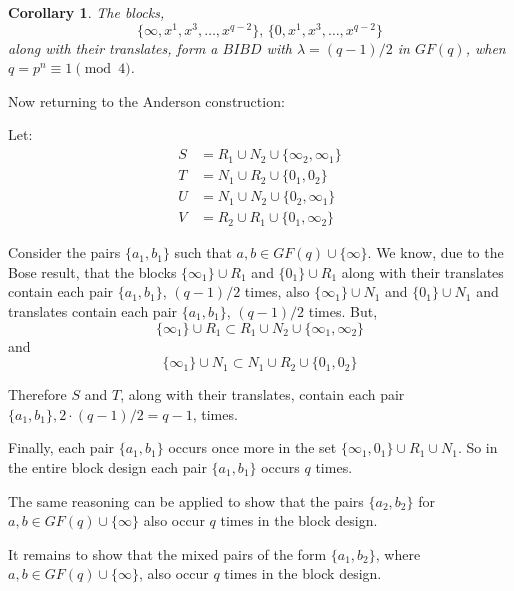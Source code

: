 \documentclass[
  11pt,
  a4paper]{book}
\newtheorem{corollary}{Corollary}[theorem]
\begin{document}
\begin{corollary}
The blocks,
\begin{equation}
\{\infty, x^1, x^3, \ldots, x^{q - 2}\},\, \{0, x^1, x^3, \ldots, x^{q - 2}\}
\end{equation}
along with their translates, form a $BIBD$ with
$\lambda = (q - 1)/2$ in $GF(q)$, when
$q = p^n \equiv 1\pmod 4$.
\end{corollary}

Now returning to the Anderson construction:

Let: \begin{align}
  S &= R_1 \cup N_2 \cup \{\infty _2, \infty _1\} \\
  T &= N_1 \cup R_2 \cup \{0_1, 0_2\} \\
  U &= N_1 \cup N_2 \cup \{0 _2, \infty _1\} \\
  V &= R_2 \cup R_1 \cup \{0_1, \infty _2\}
\end{align}

Consider the pairs \(\{a_1, b_1\}\) such that
\(a, b \in GF(q) \cup \{\infty\}\). We know, due to the Bose result,
that the blocks \(\{\infty _1\} \cup R_1\) and \(\{0 _1\} \cup R_1\)
along with their translates contain each pair \(\{a_1, b_1\}\),
\((q - 1)/2\) times, also \(\{\infty _1\} \cup N_1\) and
\(\{0 _1\} \cup N_1\) and translates contain each pair \(\{a_1, b_1\}\),
\((q - 1)/2\) times. But, \begin{equation}
\{\infty _1\} \cup R_1 \subset R_1 \cup N_2 \cup \{\infty _1, \infty _2\}
\end{equation} and \begin{equation}
\{\infty _1\} \cup N_1 \subset N_1 \cup R_2 \cup \{0_1, 0_2\}
\end{equation}

Therefore \(S\) and \(T\), along with their translates, contain each
pair \(\{a_1, b_1\}, 2\cdot (q - 1)/2 = q - 1\), times.

Finally, each pair \(\{a_1, b_1\}\) occurs once more in the set
\(\{\infty _1, 0_1\} \cup R_1 \cup N_1\). So in the entire block design
each pair \(\{a_1, b_1\}\) occurs \(q\) times.

The same reasoning can be applied to show that the pairs \(\{a_2,b_2\}\)
for \(a,b \in GF(q) \cup \{\infty\}\) also occur \(q\) times in the
block design.

It remains to show that the mixed pairs of the form \(\{a_1, b_2\}\),
where \(a, b \in GF(q) \cup \{\infty\}\), also occur \(q\) times in the
block design.
\end{document}
